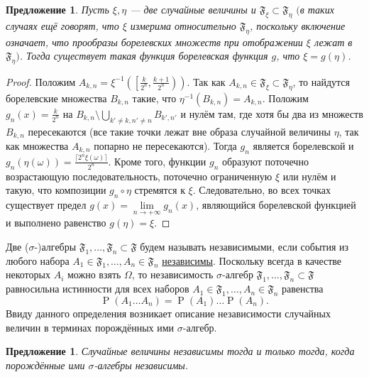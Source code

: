 \documentclass[12pt]{article}
\newtheorem{proposition}[theorem]{Предложение}
\numberwithin{theorem}{section}
\theoremstyle{definition}
\newcommand{\defin}[2]{\hypertarget{#2}{{\color{red} #1}}}
\newcommand{\prob}{\operatorname{P}}
\newcommand{\events}{\mathfrak{F}}
\begin{document}
	\begin{proposition}
		Пусть $ \xi, \eta $ --- две случайные величины и $ \events_\xi \subset \events_\eta $
		$ ( $в таких случаях ещё говорят, что $ \xi $ измерима относительно $ \events_\eta $, поскольку включение означает, что прообразы борелевских множеств при отображении $ \xi $ лежат в $ \events_\eta $$ ) $.
		Тогда существует такая функция борелевская функция $ g $, что
		$ \xi = g(\eta) $.
	\end{proposition}
	
	\begin{proof}
		Положим $ A_{k, n} = \xi^{-1}\left(\left[\tfrac{k}{2^n}, \tfrac{k + 1}{2^n}\right)\right) $.
		Так как $ A_{k, n} \in \events_\xi \subset \events_\eta $, то найдутся борелевские множества $ B_{k, n} $
		такие, что $ \eta^{-1}(B_{k, n}) = A_{k, n} $.
		Положим $ g_n(x) = \tfrac{k}{2^n} $ на $ B_{k, n} \setminus \bigcup\limits_{k' \neq k, n' \neq n} B_{k', n'} $
		и нулём там, где хотя бы два из множеств $ B_{k, n} $ пересекаются 
		(все такие точки лежат вне образа случайной величины $ \eta $, так как множества $ A_{k, n} $ попарно не пересекаются).
		Тогда $ g_n $ является борелевской и $ g_n(\eta(\omega)) = \tfrac{\lceil2^n\xi(\omega)\rceil}{2^n} $.
		Кроме того, функции $ g_n $ образуют поточечно возрастающую последовательность, поточечно ограниченную $ \xi $ или нулём
		и такую, что композиции $ g_n \circ \eta $ стремятся к $ \xi $.
		Следовательно, во всех точках существует предел $ g(x) = \lim\limits_{n \to +\infty} g_n(x) $,
		являющийся борелевской функцией
		и выполнено равенство $ g(\eta) = \xi $.
	\end{proof}
	
	Две ($ \sigma $-)алгебры $ \events_1, \ldots, \events_n \subset \events $ 
	будем называть \defin{независимыми}{independent-sigma-algebras},
	если события из любого набора $ A_1 \in \events_1, \ldots, A_n \in \events_n $ 
	\hyperlink{global-independent}{независимы}.
	Поскольку всегда в качестве некоторых $ A_i $ можно взять $ \Omega $,
	то независимость $ \sigma $-алгебр $ \events_1, \ldots, \events_n \subset \events $
	равносильна истинности для всех наборов $ A_1 \in \events_1, \ldots, A_n \in \events_n $ равенства
	$$ \prob(A_1\ldots A_n) = \prob(A_1)\ldots\prob(A_n). $$
	Ввиду данного определения возникает описание независимости случайных величин в терминах порождённых ими $ \sigma $-алгебр.
	
	\begin{proposition} \label{independence of random variables and sigma algebras}
		Случайные величины независимы тогда и только тогда, когда порождённые ими $ \sigma $-алгебры независимы.
	\end{proposition}
	
\end{document}
